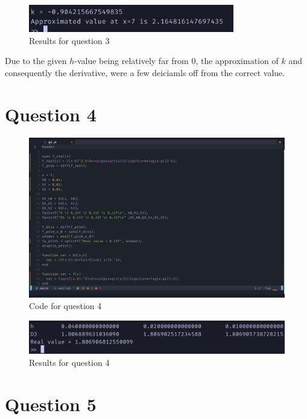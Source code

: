 \documentclass{article}
\begin{document}
\begin{figure}[H]
	\centering
	\includegraphics[width=0.8\textwidth]{imgs/q3_results.png}
	\caption{Results for question 3}
	\label{fig:q3_result}
\end{figure}
Due to the given $h$-value being relatively far from $0$, the approximation of $k$ and consequently the derivative, were a few deiciamls off from the correct value.

\newpage
\section{Question 4}
\begin{figure}[H]
	\centering
	\includegraphics[width=\textwidth]{imgs/q4_code.png}
	\caption{Code for question 4}
	\label{fig:q4_code}
\end{figure}

\begin{figure}[H]
	\centering
	\includegraphics[width=\textwidth]{imgs/q4_results.png}
	\caption{Results for question 4}
	\label{fig:q4_result}
\end{figure}

\newpage
\section{Question 5}
\end{document}
